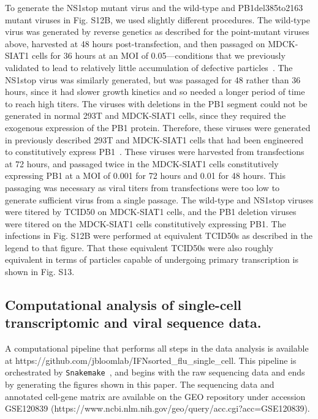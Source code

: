 \documentclass[]{article}
\begin{document}
To generate the NS1stop mutant virus and the wild-type and PB1del385to2163 mutant viruses in Fig. S12B, we used slightly different procedures.
The wild-type virus was generated by reverse genetics as described for the point-mutant viruses above, harvested at 48 hours post-transfection, and then passaged on MDCK-SIAT1 cells for 36 hours at an MOI of 0.05---conditions that we previously validated to lead to relatively little accumulation of defective particles~\cite{russell2018extreme}.
The NS1stop virus was similarly generated, but was passaged for 48 rather than 36 hours, since it had slower growth kinetics and so needed a longer period of time to reach high titers.
The viruses with deletions in the PB1 segment could not be generated in normal 293T and MDCK-SIAT1 cells, since they required the exogenous expression of the PB1 protein.
Therefore, these viruses were generated in previously described 293T and MDCK-SIAT1 cells that had been engineered to constitutively express PB1~\cite{bloom2010permissive}.
These viruses were harvested from transfections at 72 hours, and passaged twice in the MDCK-SIAT1 cells constitutively expressing PB1 at a MOI of 0.001 for 72 hours and 0.01 for 48 hours. 
This passaging was necessary as viral titers from transfections were too low to generate sufficient virus from a single passage.
The wild-type and NS1stop viruses were titered by TCID50 on MDCK-SIAT1 cells, and the PB1 deletion viruses were titered on the MDCK-SIAT1 cells constitutively expressing PB1.
The infections in Fig. S12B were performed at equivalent TCID50s as described in the legend to that figure.
That these equivalent TCID50s were also roughly equivalent in terms of particles capable of undergoing primary transcription is shown in Fig. S13.

\subsection*{Computational analysis of single-cell transcriptomic and viral sequence data.}
A computational pipeline that performs all steps in the data analysis is available at https://github.com/jbloomlab/IFNsorted\_flu\_single\_cell. 
This pipeline is orchestrated by \texttt{Snakemake}~\cite{koster2012snakemake}, and begins with the raw sequencing data and ends by generating the figures shown in this paper.
The sequencing data and annotated cell-gene matrix are available on the GEO repository under accession GSE120839 (https://www.ncbi.nlm.nih.gov/geo/query/acc.cgi?acc=GSE120839).
\end{document}
